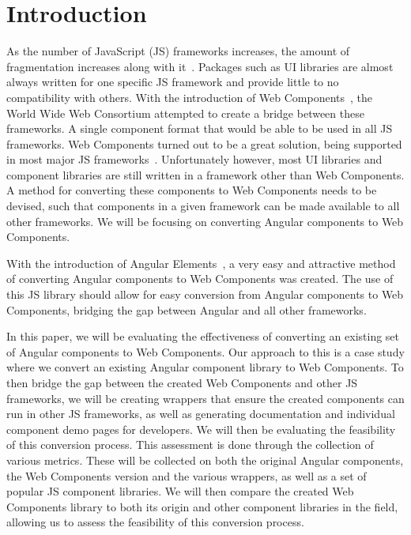 \chapter{Introduction}
As the number of JavaScript (JS) frameworks increases, the amount of fragmentation increases along with it~. Packages such as UI libraries are almost always written for one specific JS framework and provide little to no compatibility with others. With the introduction of Web Components~, the World Wide Web Consortium attempted to create a bridge between these frameworks. A single component format that would be able to be used in all JS frameworks. Web Components turned out to be a great solution, being supported in most major JS frameworks~. Unfortunately however, most UI libraries and component libraries are still written in a framework other than Web Components. A method for converting these components to Web Components needs to be devised, such that components in a given framework can be made available to all other frameworks. We will be focusing on converting Angular components to Web Components.

With the introduction of Angular Elements~, a very easy and attractive method of converting Angular components to Web Components was created. The use of this JS library should allow for easy conversion from Angular components to Web Components, bridging the gap between Angular and all other frameworks.

In this paper, we will be evaluating the effectiveness of converting an existing set of Angular components to Web Components. Our approach to this is a case study where we convert an existing Angular component library to Web Components. To then bridge the gap between the created Web Components and other JS frameworks, we will be creating wrappers that ensure the created components can run in other JS frameworks, as well as generating documentation and individual component demo pages for developers. We will then be evaluating the feasibility of this conversion process. This assessment is done through the collection of various metrics. These will be collected on both the original Angular components, the Web Components version and the various wrappers, as well as a set of popular JS component libraries. We will then compare the created Web Components library to both its origin and other component libraries in the field, allowing us to assess the feasibility of this conversion process.

